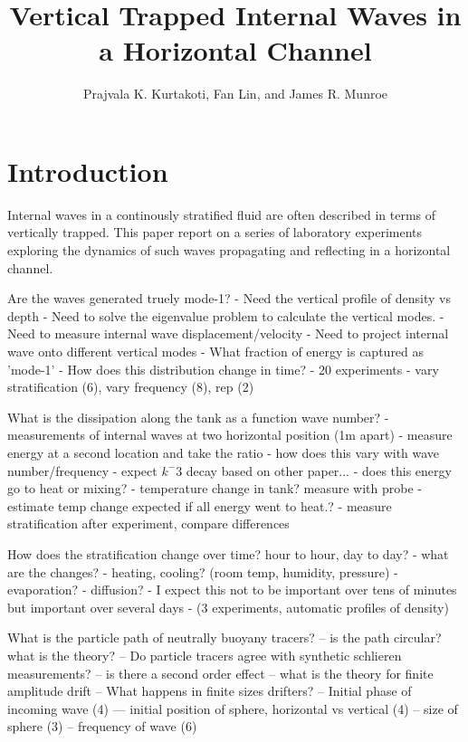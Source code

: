 \documentclass[11pt,letterpaper]{article}
\title{Vertical Trapped Internal Waves in a Horizontal Channel}
\author{Prajvala K. Kurtakoti, Fan Lin, and James R. Munroe}
\begin{document}
	\maketitle
	
	\section{Introduction}
	
	Internal waves in a continously stratified fluid are often described in terms of vertically trapped.  This paper report on a series of laboratory experiments exploring the dynamics of such waves propagating and reflecting in a horizontal channel.
	
	 Are the waves generated truely mode-1?  
		- Need the vertical profile of density vs depth 
		- Need to solve the eigenvalue problem to calculate the vertical modes.
		- Need to measure internal wave displacement/velocity
		- Need to project internal wave onto different vertical modes
		- What fraction of energy is captured as 'mode-1'
		- How does this distribution change in time?
		- 20 experiments
		- vary stratification (6), vary frequency (8), rep (2)

	What is the dissipation along the tank as a function wave number?	
	   - measurements of internal waves at two horizontal position (1m apart)
	   - measure energy at a second location and take the ratio
	       - how does this vary with wave number/frequency
	       - expect $k^-3$ decay based on other paper... 
	   - does this energy go to heat or mixing?
	       - temperature change in tank? measure with probe
	            - estimate temp change expected if all energy went to heat.?
	       - measure stratification after experiment, compare differences
	   
	  How does the stratification change over time? hour to hour, day to day?
	   	 - what are the changes?
	   	 - heating, cooling? (room temp, humidity, pressure)
	   	 - evaporation?
	   	 - diffusion?
	   	 - I expect this not to be important over tens of minutes but important over several days
	   	 - (3 experiments, automatic profiles of density)
	   	 
	 What is the particle path of neutrally buoyany tracers? 
	    -- is the path circular? what is the theory?
	    -- Do particle tracers agree with synthetic schlieren measurements?
	    -- is there a second order effect
		   -- what is the theory for finite amplitude drift
		   -- What happens in finite sizes drifters? 
		       -- Initial phase of incoming wave    (4)
		       --- initial position of sphere, horizontal vs vertical (4)
		       --  size of sphere (3)
		        --  frequency of wave (6)
	   	
\end{document}
